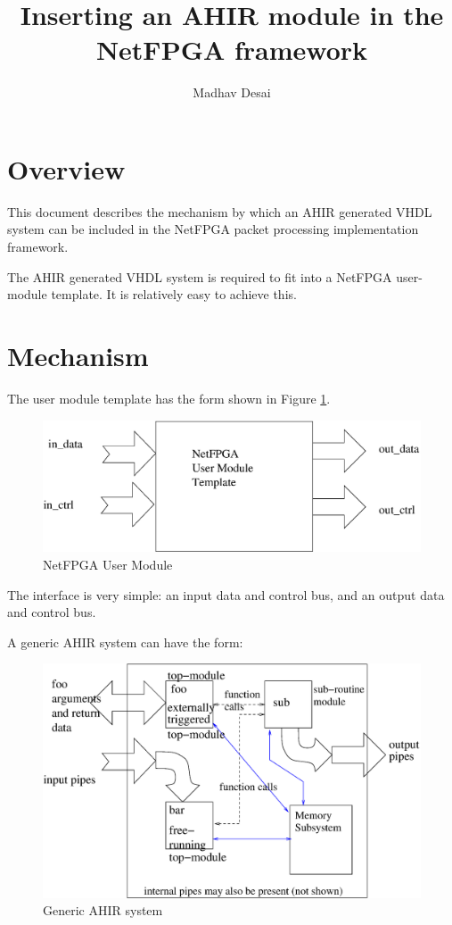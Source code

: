 \documentclass{article}
\title{Inserting an AHIR module in the NetFPGA framework}
\author{Madhav Desai}
\begin{document}
\maketitle

\section{Overview}

This document describes the mechanism by which an 
AHIR generated VHDL system can be included in the NetFPGA packet
processing implementation framework.  

The AHIR generated VHDL system is required to fit into 
a NetFPGA user-module template. It is relatively easy to
achieve this. 


\section{Mechanism}

The user module template has the form shown in Figure \ref{fig:NetFPGAUserModule}.
\begin{figure}
  \centering
  \includegraphics[scale=0.7]{NetFPGAUserModule.eps}
  \caption{NetFPGA User Module}
  \label{fig:NetFPGAUserModule}
\end{figure}
The interface is very simple: an input data and control bus,
and an output data and control bus.

A generic AHIR system can have the form:
\begin{figure}
  \centering
  \includegraphics[scale=0.7]{GenericAhirSystem.eps}
  \caption{Generic AHIR system}
  \label{fig:GenericAhirSystem}
\end{figure}
\end{document}
